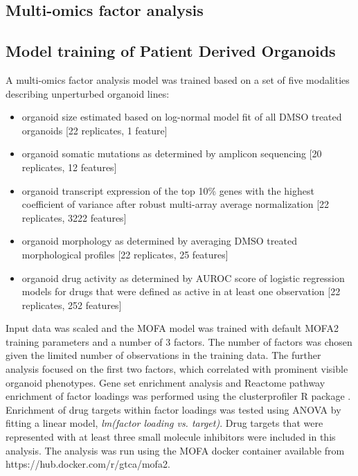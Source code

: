 \begin{flushleft}
\section{Multi-omics factor analysis}
\subsection{Model training of Patient Derived Organoids}
A multi-omics factor analysis model \parencite{argelaguetMultiOmicsFactorAnalysis2018b} was trained based on a set of five modalities describing unperturbed organoid lines:

\begin{itemize}
    \item organoid size estimated based on log-normal model fit of all DMSO treated organoids [22 replicates, 1 feature]
    \item organoid somatic mutations as determined by amplicon sequencing [20 replicates, 12 features]
    \item organoid transcript expression of the top 10\% genes with the highest coefficient of variance after robust multi-array average normalization [22 replicates, 3222 features]
    \item organoid morphology as determined by averaging DMSO treated morphological profiles [22 replicates, 25 features]
    \item organoid drug activity as determined by AUROC score of logistic regression models for drugs that were defined as active in at least one observation [22 replicates, 252 features]
\end{itemize}


Input data was scaled and the MOFA model was trained with default MOFA2 training parameters and a number of 3 factors. The number of factors was chosen given the limited number of observations in the training data. The further analysis focused on the first two factors, which correlated with prominent visible organoid phenotypes. Gene set enrichment analysis and Reactome pathway enrichment of factor loadings was performed using the clusterprofiler R package \parencite{yuClusterProfilerPackageComparing2012}. Enrichment of drug targets within factor loadings was tested using ANOVA by fitting a linear model, \textit{lm(factor loading vs. target)}. Drug targets that were represented with at least three small molecule inhibitors were included in this analysis. The analysis was run using the MOFA docker container available from https://hub.docker.com/r/gtca/mofa2.


\end{flushleft}
